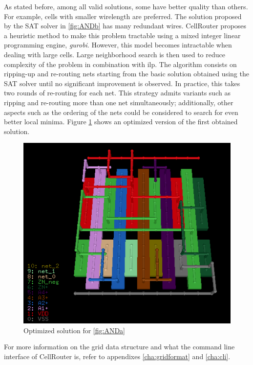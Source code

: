 As stated before, among all valid solutions, some have better quality than others. For example, cells with smaller wirelength are preferred. The solution proposed by the SAT solver in \ref{fig:ANDb} has many redundant wires. CellRouter proposes a heuristic method to make this problem tractable using a mixed integer linear programming engine, \textit{gurobi}. However, this model becomes intractable when dealing with large cells. Large neighborhood search is then used to reduce complexity of the problem in combination with \gls{ilp}. The algorithm consists on ripping-up and re-routing nets starting from the basic solution obtained using the SAT solver until no significant improvement is observed. In practice, this takes two rounds of re-routing for each net. This strategy admits variants such as ripping and re-routing more than one net simultaneously; additionally, other aspects such as the ordering of the nets could be considered to search for even better local minima. Figure \ref{fig:ANDc} shows an optimized version of the first obtained solution. \\

\begin{figure}[h!]
  \centering
  \includegraphics[scale=0.6]{img/bckgrnd/ANDc.png}
  \caption{Optimized solution for \ref{fig:ANDa}}
  \label{fig:ANDc}
\end{figure}

For more information on the grid data structure and what the command line interface of CellRouter is, refer to appendixes \ref{cha:gridformat} and \ref{cha:cli}.

